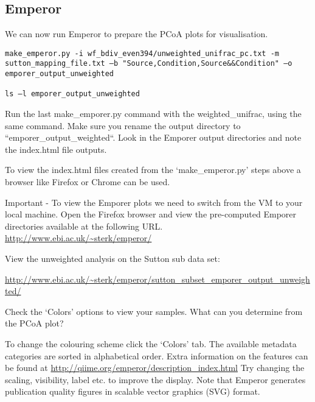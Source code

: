 \subsection{Emperor}
\begin{steps}
We can now run Emperor to prepare the PCoA plots for visualisation.

\begin{lstlisting}
make_emperor.py -i wf_bdiv_even394/unweighted_unifrac_pc.txt -m sutton_mapping_file.txt –b "Source,Condition,Source&&Condition" –o emporer_output_unweighted
 
ls –l emporer_output_unweighted
\end{lstlisting}
\end{steps}

\begin{steps}
Run the last make_emporer.py command with the weighted_unifrac, using the same command. Make sure you rename the output directory to “emporer_output_weighted“. Look in the Emporer output directories and note the index.html file outputs.
\end{steps}

To view the index.html files created from the ‘make_emperor.py’ steps above a browser like Firefox or Chrome can be used. 

\begin{steps}
Important - To view the Emporer plots we need to switch from the VM to your local machine.
Open the Firefox browser and view the pre-computed Emporer directories available at the following URL. \url{http://www.ebi.ac.uk/~sterk/emperor/}
\end{steps}

View the unweighted analysis on the Sutton sub data set:
\begin{steps}
\url{http://www.ebi.ac.uk/~sterk/emperor/sutton_subset_emporer_output_unweighted/}
\end{steps}


\begin{questions}
Check the ‘Colors’ options to view your samples. 
What can you determine from the PCoA plot?
\begin{answer}

\end{answer}
\end{questions}

\begin{information}
To change the colouring scheme click the ‘Colors’ tab. The available metadata categories are sorted in alphabetical order. Extra information on the features can be found at \url{http://qiime.org/emperor/description_index.html}
Try changing the scaling, visibility, label etc. to improve the display.
Note that Emperor generates publication quality figures in scalable vector graphics (SVG) format.
\end{information}

